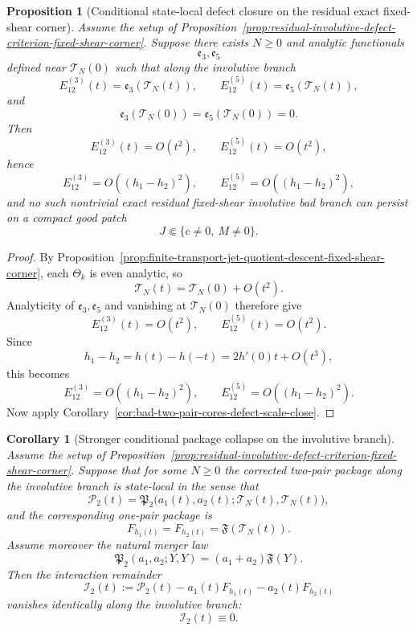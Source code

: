 \documentclass[11pt,a4paper]{amsart}
\theoremstyle{plain}
\newtheorem{proposition}[theorem]{Proposition}
\newtheorem{corollary}[theorem]{Corollary}
\theoremstyle{definition}
\begin{document}
\begin{proposition}[Conditional state-local defect closure on the residual exact fixed-shear corner]
\label{prop:conditional-state-local-defect-closure-fixed-shear-corner}
Assume the setup of
Proposition~\ref{prop:residual-involutive-defect-criterion-fixed-shear-corner}.
Suppose there exists $N\ge 0$ and analytic functionals
\[
\mathfrak e_3,\mathfrak e_5
\]
defined near $\mathcal T_N(0)$ such that along the involutive branch
\[
E_{12}^{(3)}(t)=\mathfrak e_3(\mathcal T_N(t)),
\qquad
E_{12}^{(5)}(t)=\mathfrak e_5(\mathcal T_N(t)),
\]
and
\[
\mathfrak e_3(\mathcal T_N(0))=\mathfrak e_5(\mathcal T_N(0))=0.
\]
Then
\[
E_{12}^{(3)}(t)=O(t^2),
\qquad
E_{12}^{(5)}(t)=O(t^2),
\]
hence
\[
E_{12}^{(3)}=O((h_1-h_2)^2),
\qquad
E_{12}^{(5)}=O((h_1-h_2)^2),
\]
and no such nontrivial exact residual fixed-shear involutive bad branch can
persist on a compact good patch
\[
J\Subset\{c\neq 0,\ M\neq 0\}.
\]
\end{proposition}

\begin{proof}
By Proposition~\ref{prop:finite-transport-jet-quotient-descent-fixed-shear-corner},
each $\Theta_k$ is even analytic, so
\[
\mathcal T_N(t)=\mathcal T_N(0)+O(t^2).
\]
Analyticity of $\mathfrak e_3,\mathfrak e_5$ and vanishing at $\mathcal T_N(0)$
therefore give
\[
E_{12}^{(3)}(t)=O(t^2),
\qquad
E_{12}^{(5)}(t)=O(t^2).
\]
Since
\[
h_1-h_2=h(t)-h(-t)=2h'(0)t+O(t^3),
\]
this becomes
\[
E_{12}^{(3)}=O((h_1-h_2)^2),
\qquad
E_{12}^{(5)}=O((h_1-h_2)^2).
\]
Now apply Corollary~\ref{cor:bad-two-pair-cores-defect-scale-close}.
\end{proof}

\begin{corollary}[Stronger conditional package collapse on the involutive branch]
\label{cor:stronger-state-local-package-collapse-fixed-shear-corner}
Assume the setup of
Proposition~\ref{prop:residual-involutive-defect-criterion-fixed-shear-corner}.
Suppose that for some $N\ge 0$ the corrected two-pair package along the
involutive branch is state-local in the sense that
\[
\mathcal P_2(t)
=
\mathfrak P_2\bigl(a_1(t),a_2(t);\mathcal T_N(t),\mathcal T_N(t)\bigr),
\]
and the corresponding one-pair package is
\[
F_{h_1(t)}=F_{h_2(t)}=\mathfrak F(\mathcal T_N(t)).
\]
Assume moreover the natural merger law
\[
\mathfrak P_2(a_1,a_2;Y,Y)=(a_1+a_2)\mathfrak F(Y).
\]
Then the interaction remainder
\[
\mathcal I_2(t):=
\mathcal P_2(t)-a_1(t)F_{h_1(t)}-a_2(t)F_{h_2(t)}
\]
vanishes identically along the involutive branch:
\[
\mathcal I_2(t)\equiv 0.
\]
\end{corollary}
\end{document}
